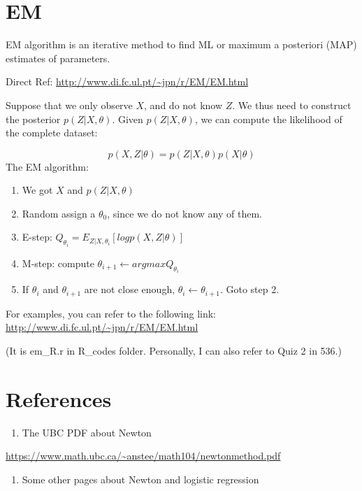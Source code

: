 \documentclass[]{book}
\providecommand{\tightlist}{%
  \setlength{\itemsep}{0pt}\setlength{\parskip}{0pt}}
\begin{document}
\section{EM}\label{em}

EM algorithm is an iterative method to find ML or maximum a posteriori
(MAP) estimates of parameters.

Direct Ref: \url{http://www.di.fc.ul.pt/~jpn/r/EM/EM.html}

Suppose that we only observe \(X\), and do not know \(Z\). We thus need
to construct the posterior \(p(Z|X,\theta)\). Given \(p(Z|X,\theta)\),
we can compute the likelihood of the complete dataset:

\[p(X, Z|\theta)=p(Z|X,\theta)p(X|\theta)\] The EM algorithm:

\begin{enumerate}
\def\labelenumi{(\arabic{enumi})}
\setcounter{enumi}{-1}
\item
  We got \(X\) and \(p(Z|X,\theta)\)
\item
  Random assign a \(\theta_0\), since we do not know any of them.
\item
  E-step: \(Q_{\theta_i} = E_{Z|X,\theta_i}[log p(X,Z|\theta)]\)
\item
  M-step: compute \(\theta_{i+1} \leftarrow argmax Q_{\theta_i}\)
\item
  If \(\theta_i\) and \(\theta_{i+1}\) are not close enough,
  \(\theta_i \leftarrow \theta_{i+1}\). Goto step 2.
\end{enumerate}

For examples, you can refer to the following link:
\url{http://www.di.fc.ul.pt/~jpn/r/EM/EM.html}

(It is em\_R.r in R\_codes folder. Personally, I can also refer to Quiz
2 in 536.)

\section{References}\label{references-2}

\begin{enumerate}
\def\labelenumi{\arabic{enumi}.}
\tightlist
\item
  The UBC PDF about Newton
\end{enumerate}

\url{https://www.math.ubc.ca/~anstee/math104/newtonmethod.pdf}

\begin{enumerate}
\def\labelenumi{\arabic{enumi}.}
\setcounter{enumi}{1}
\tightlist
\item
  Some other pages about Newton and logistic regression
\end{enumerate}
\end{document}
